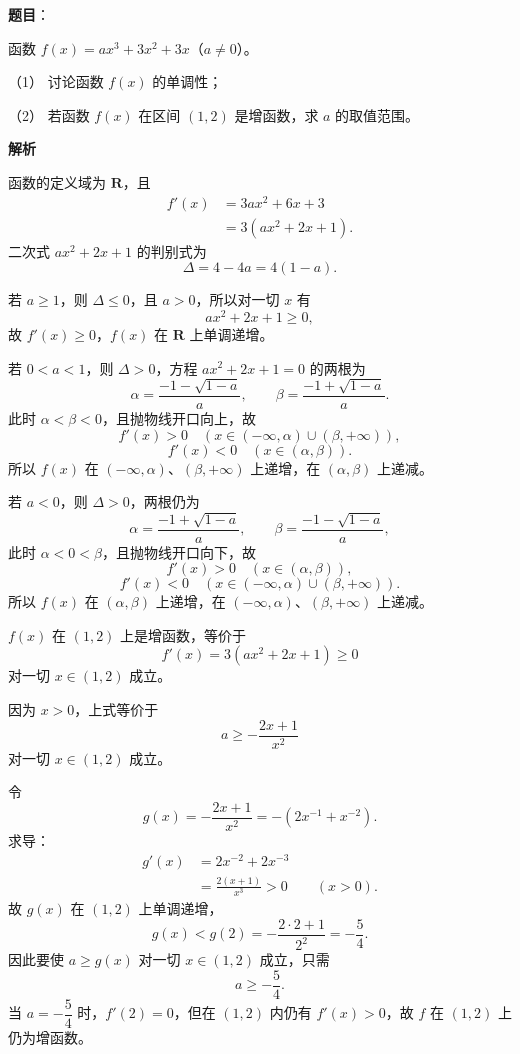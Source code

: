 \begin{answer}

\textbf{题目}：

函数 $f(x)=ax^3+3x^2+3x$（$a\neq0$）。

（1） 讨论函数 $f(x)$ 的单调性；

（2） 若函数 $f(x)$ 在区间 $(1,2)$ 是增函数，求 $a$ 的取值范围。

\textbf{解析}

函数的定义域为 $\mathbf R$，且
\nopagebreak[4]
\[\begin{aligned}
f'(x)&=3ax^2+6x+3\\
&=3(ax^2+2x+1).
\end{aligned}\]
二次式 $ax^2+2x+1$ 的判别式为
\nopagebreak[4]
\[\Delta=4-4a=4(1-a).\]


若 $a\geqslant1$，则 $\Delta\leqslant0$，且 $a>0$，所以对一切 $x$ 有
\nopagebreak[4]
\[ax^2+2x+1\geqslant0,\]
故 $f'(x)\geqslant0$，$f(x)$ 在 $\mathbf R$ 上单调递增。

若 $0<a<1$，则 $\Delta>0$，方程 $ax^2+2x+1=0$ 的两根为
\nopagebreak[4]
\[\alpha=\frac{-1-\sqrt{1-a}}{a},\qquad
\beta=\frac{-1+\sqrt{1-a}}{a}.\]
此时 $\alpha<\beta<0$，且抛物线开口向上，故
\nopagebreak[4]
\[f'(x)>0\quad(x\in(-\infty,\alpha)\cup(\beta,+\infty)),\]
\nopagebreak[4]
\[f'(x)<0\quad(x\in(\alpha,\beta)).\]
所以 $f(x)$ 在 $(-\infty,\alpha)$、$(\beta,+\infty)$ 上递增，在 $(\alpha,\beta)$ 上递减。

若 $a<0$，则 $\Delta>0$，两根仍为
\nopagebreak[4]
\[\alpha=\frac{-1+\sqrt{1-a}}{a},\qquad
\beta=\frac{-1-\sqrt{1-a}}{a},\]
此时 $\alpha<0<\beta$，且抛物线开口向下，故
\nopagebreak[4]
\[f'(x)>0\quad(x\in(\alpha,\beta)),\]
\nopagebreak[4]
\[f'(x)<0\quad(x\in(-\infty,\alpha)\cup(\beta,+\infty)).\]
所以 $f(x)$ 在 $(\alpha,\beta)$ 上递增，在 $(-\infty,\alpha)$、$(\beta,+\infty)$ 上递减。


$f(x)$ 在 $(1,2)$ 上是增函数，等价于
\nopagebreak[4]
\[f'(x)=3(ax^2+2x+1)\geqslant0\]
对一切 $x\in(1,2)$ 成立。

因为 $x>0$，上式等价于
\nopagebreak[4]
\[a\geqslant-\frac{2x+1}{x^2}\]
对一切 $x\in(1,2)$ 成立。

令
\nopagebreak[4]
\[g(x)=-\frac{2x+1}{x^2}=-(2x^{-1}+x^{-2}).\]
求导：
\nopagebreak[4]
\[\begin{aligned}
g'(x)&=2x^{-2}+2x^{-3}\\
&=\frac{2(x+1)}{x^3}>0\qquad(x>0).
\end{aligned}\]
故 $g(x)$ 在 $(1,2)$ 上单调递增，
\nopagebreak[4]
\[g(x)<g(2)=-\frac{2\cdot2+1}{2^2}=-\frac54.\]
因此要使 $a\geqslant g(x)$ 对一切 $x\in(1,2)$ 成立，只需
\nopagebreak[4]
\[a\geqslant-\frac54.\]
当 $a=-\dfrac54$ 时，$f'(2)=0$，但在 $(1,2)$ 内仍有 $f'(x)>0$，故 $f$ 在 $(1,2)$ 上仍为增函数。


\end{answer}
